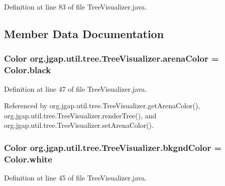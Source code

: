 Definition at line 83 of file Tree\-Visualizer.\-java.



\subsection{Member Data Documentation}
\hypertarget{classorg_1_1jgap_1_1util_1_1tree_1_1_tree_visualizer_a8712811664d9f38c502af5612d001021}{
\subsubsection[{arena\-Color}]{\setlength{\rightskip}{0pt plus 5cm}Color org.\-jgap.\-util.\-tree.\-Tree\-Visualizer.\-arena\-Color = Color.\-black\hspace{0.3cm}{\ttfamily [private]}}}\label{classorg_1_1jgap_1_1util_1_1tree_1_1_tree_visualizer_a8712811664d9f38c502af5612d001021}


Definition at line 47 of file Tree\-Visualizer.\-java.



Referenced by org.\-jgap.\-util.\-tree.\-Tree\-Visualizer.\-get\-Arena\-Color(), org.\-jgap.\-util.\-tree.\-Tree\-Visualizer.\-render\-Tree(), and org.\-jgap.\-util.\-tree.\-Tree\-Visualizer.\-set\-Arena\-Color().

\hypertarget{classorg_1_1jgap_1_1util_1_1tree_1_1_tree_visualizer_a9ea1406597b394ba784c5a95c6c5b648}{
\subsubsection[{bkgnd\-Color}]{\setlength{\rightskip}{0pt plus 5cm}Color org.\-jgap.\-util.\-tree.\-Tree\-Visualizer.\-bkgnd\-Color = Color.\-white\hspace{0.3cm}{\ttfamily [private]}}}\label{classorg_1_1jgap_1_1util_1_1tree_1_1_tree_visualizer_a9ea1406597b394ba784c5a95c6c5b648}


Definition at line 45 of file Tree\-Visualizer.\-java.



